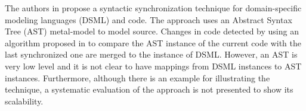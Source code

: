 The authors in \cite{angyal_synchronizing_2008} propose a syntactic synchronization technique for domain-specific modeling languages (DSML) and code. The approach uses an Abstract Syntax Tree (AST) metal-model to model source. Changes in code detected by using an algorithm proposed  in \cite{Chawathe:1996:CDH:235968.233366} to compare the AST instance of the current code with the last synchronized one are merged to the instance of DSML. However, an AST is very low level and it is not clear to have mappings from DSML instances to AST instances. Furthermore, although there is an example for illustrating the technique, a systematic evaluation of the approach is not presented to show its scalability.


